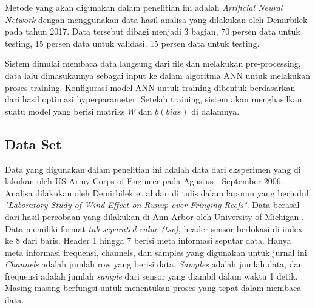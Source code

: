 Metode yang akan digunakan dalam penelitian ini adalah \emph{Artificial Neural Network} dengan menggunakan data hasil analisa yang dilakukan oleh Demirbilek pada tahun 2017\cite{DemirbilekReport}. Data tersebut dibagi menjadi 3 bagian, 70 persen data untuk testing, 15 persen data untuk validasi, 15 persen data untuk testing.

Sistem dimulai membaca data langsung dari file dan melakukan pre-processing, data lalu dimasukannya sebagai input ke dalam algoritma ANN untuk melakukan proses training. Konfigurasi model ANN untuk training dibentuk berdasarkan dari hasil optimasi hyperparameter. Setelah training, sistem akan menghasilkan suatu model yang berisi matriks $W$ dan $b (bias)$ di dalamnya.

\subsection{Data Set}
Data yang digunakan dalam penelitian ini adalah data dari eksperimen yang di lakukan oleh US Army Corps of Engineer pada Agustus - September 2006. Analisa dilakukan oleh Demirbilek et al dan di tulis dalam laporan yang berjudul \emph{"Laboratory Study of Wind Effect on Runup over Fringing Reefs"}. Data berasal dari hasil percobaan yang dilakukan di Ann Arbor oleh University of Michigan \cite{TechnicalReports}. Data memiliki format \emph{tab separated value (tsv)}, header sensor berlokasi di 
index ke 8 dari baris. Header 1 hingga 7 berisi meta informasi seputar data. Hanya meta informasi frequensi, channels, dan samples yang digunakan untuk jurnal ini. \emph{Channels} adalah jumlah row yang berisi data, \emph{Samples} adalah jumlah data, dan frequensi adalah jumlah \emph{sample} dari sensor yang diambil dalam waktu 1 detik. Masing-masing berfungsi untuk menentukan proses yang tepat dalam membaca data.
\FloatBarrier
